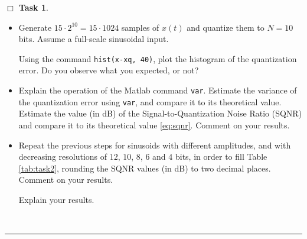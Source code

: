 \documentclass[11pt]{article}
\newcounter{ntask}
\newtheorem{task}[ntask]{$\Box$ Task}
\newenvironment{Task}
{\begin{task}\end{task} \vspace{-0.1in}\sf}
{\hfill \QED}
\def\QED{~\rule[-1pt]{5pt}{5pt}\par\medskip}
\begin{document}
\begin{Task}

\begin{itemize}

\item 
Generate $15 \cdot 2^{10} = 15\cdot 1024$ samples of $x(t)$ and quantize them
to $N=10$ bits. Assume a full-scale sinusoidal input. 

Using the command {\tt hist(x-xq, 40)}, plot the histogram of the quantization error.
Do you observe what you expected, or not? 

\item Explain the operation of the Matlab command {\tt var}. 
Estimate the variance of the quantization error using {\tt var}, and compare it to its theoretical value.
Estimate the value (in dB) of the Signal-to-Quantization Noise Ratio (SQNR) and compare it to its theoretical value \eqref{eq:sqnr}.
Comment on your results.

\item Repeat the previous steps for sinusoids with different amplitudes, and with decreasing resolutions of $12$, $10$, $8$, $6$ and $4$ bits, in order to fill  Table \ref{tab:task2}, rounding the SQNR values (in dB) to two decimal places. Comment on your results.

%

Explain your results.


\end{itemize}
\vspace*{-0.5cm}
\end{Task}
\end{document}
